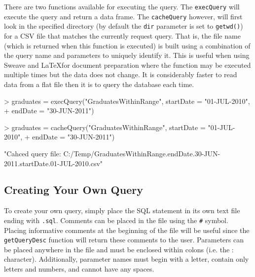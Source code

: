 \documentclass[letterpaper,11pt]{article}
\begin{document}
There are two functions available for executing the query. The \texttt{execQuery} will execute the query and return a data frame. The \texttt{cacheQuery} however, will first look in the specified directory (by default the \texttt{dir} parameter is set to \texttt{getwd()}) for a CSV file that matches the currently request query. That is, the file name (which is returned when this function is executed) is built using a combination of the query name and parameters to uniquely identify it. This is useful when using Sweave and \LaTeX for document preparation where the function may be executed multiple times but the data does not change. It is considerably faster to read data from a flat file then it is to query the database each time.

\begin{Schunk}
\begin{Sinput}
> graduates = execQuery("GraduatesWithinRange", startDate = "01-JUL-2010", 
+     endDate = "30-JUN-2011")
\end{Sinput}
\end{Schunk}

\begin{Schunk}
\begin{Sinput}
> graduates = cacheQuery("GraduatesWithinRange", startDate = "01-JUL-2010", 
+     endDate = "30-JUN-2011")
\end{Sinput}
\begin{Soutput}
[1] "Cahced query file: C:/Temp/GraduatesWithinRange.endDate.30-JUN-2011.startDate.01-JUL-2010.csv"
\end{Soutput}
\end{Schunk}

\subsection{Creating Your Own Query}

To create your own query, simply place the SQL statement in its own text file ending with \texttt{.sql}. Comments can be placed in the file using the \texttt{\#} symbol. Placing informative comments at the beginning of the file will be useful since the \texttt{getQueryDesc} function will return these comments to the user. Parameters can be placed anywhere in the file and must be enclosed within colons (i.e. the : character). Additionally, parameter names must begin with a letter, contain only letters and numbers, and cannot have any spaces.
\end{document}
